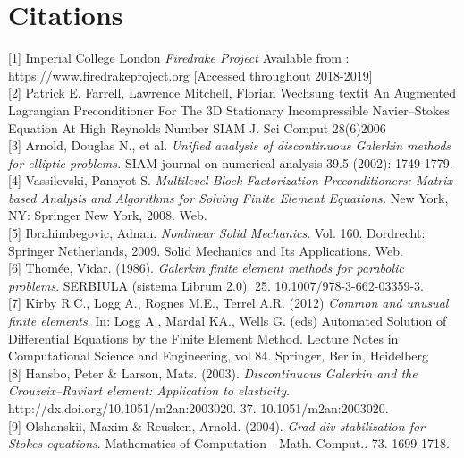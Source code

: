 \documentclass[11pt,twoside,a4paper]{article}
\begin{document}
\section{Citations}

[1] Imperial College London \textit{Firedrake Project} Available from :\\
 https://www.firedrakeproject.org [Accessed throughout 2018-2019]\\

[2] Patrick E. Farrell, Lawrence Mitchell, Florian Wechsung
textit{ An Augmented Lagrangian Preconditioner For The 3D Stationary Incompressible Navier–Stokes Equation At High Reynolds Number}
SIAM J. Sci Comput 28(6)2006\\

[3] Arnold, Douglas N., et al. \textit{Unified analysis of discontinuous Galerkin methods for elliptic problems.} SIAM journal on numerical analysis 39.5 (2002): 1749-1779.\\

[4] Vassilevski, Panayot S. \textit{Multilevel Block Factorization Preconditioners: Matrix-based Analysis and Algorithms for Solving Finite Element Equations.} New York, NY: Springer New York, 2008. Web.\\

[5] Ibrahimbegovic, Adnan. \textit{Nonlinear Solid Mechanics}. Vol. 160. Dordrecht: Springer Netherlands, 2009. Solid Mechanics and Its Applications. Web.\\

[6] Thomée, Vidar. (1986). \textit{Galerkin finite element methods for parabolic problems}. SERBIULA (sistema Librum 2.0). 25. 10.1007/978-3-662-03359-3. \\

[7]  Kirby R.C., Logg A., Rognes M.E., Terrel A.R. (2012) \textit{Common and unusual finite elements}. In: Logg A., Mardal KA., Wells G. (eds) Automated Solution of Differential Equations by the Finite Element Method. Lecture Notes in Computational Science and Engineering, vol 84. Springer, Berlin, Heidelberg\\

[8] Hansbo, Peter \& Larson, Mats. (2003). \textit{Discontinuous Galerkin and the Crouzeix–Raviart element: Application to elasticity}. \\
http://dx.doi.org/10.1051/m2an:2003020. 37. 10.1051/m2an:2003020. \\

[9] Olshanskii, Maxim \& Reusken, Arnold. (2004). \textit{Grad-div stabilization for Stokes equations}. Mathematics of Computation - Math. Comput.. 73. 1699-1718. \\
\end{document}
